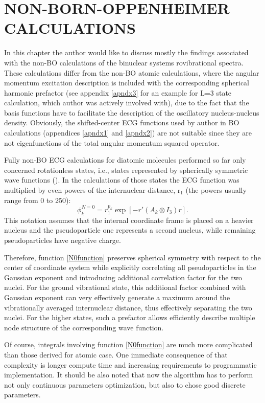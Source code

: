 \chapter{NON-BORN-OPPENHEIMER CALCULATIONS\label{nonBO}}

In this chapter the author would like to discuss mostly the 
findings associated with the non-BO calculations of the binuclear
systems rovibrational spectra. These calculations differ from 
the non-BO atomic calculations, where the angular momentum 
excitation description is included with the corresponding 
spherical harmonic prefactor (see appendix \ref{apndx3} for an
example for L=3 state calculation, which author was actively 
involved with), 
due to the fact that the basis functions have to facilitate the 
description of the oscillatory nucleus-nucleus density.
Obviously, the shifted-center ECG functions used by author in
BO calculations (appendices \ref{apndx1} and \ref{apndx2}) are
not suitable since they are not eigenfunctions of the total
angular momentum squared operator.

Fully non-BO ECG calculations for diatomic molecules performed 
so far only concerned rotationless states, i.e., states represented 
by spherically symmetric wave functions (\cite{N0_1,N0_2}). 
In the calculations of those states the ECG function was multiplied 
by even powers of the internuclear distance, r$_1$ 
(the powers usually range from 0 to 250):
\begin{equation}
\phi_k^{N=0} = r_1^{p_k} \exp [-r'(A_k \otimes I_3) r].
\label{N0function}
\end{equation}
This notation assumes that the internal coordinate frame is placed on a heavier
nucleus and the pseudoparticle one represents a second nucleus, while remaining
pseudoparticles have negative charge.

Therefore, function \ref{N0function} preserves spherical symmetry with respect
to the center of coordinate system while explicitly correlating all pseudoparticles
in the Gaussian exponent and introducing additional correlation factor for
the two nuclei. For the ground vibrational state, this additional factor combined 
with Gaussian exponent can very effectively generate a maximum around the vibrationally
averaged internuclear distance, thus effectively separating the two nuclei.
For the higher states, such a prefactor allows efficiently describe multiple node 
structure of the corresponding wave function.

Of course, integrals involving function \ref{N0function} are much more complicated 
than those derived for atomic case. One immediate consequence of that complexity 
is longer compute time and increasing requirements to programmatic implementation.
It should be also noted that now the algorithm has to perform not only continuous
parameters optimization, but also to chose good discrete parameters.

